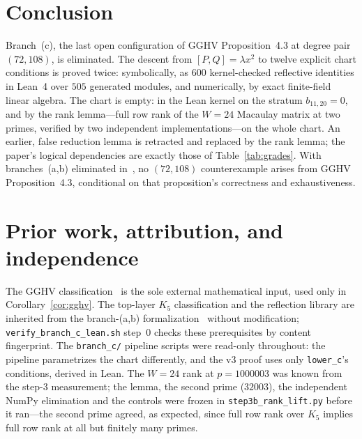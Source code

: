 \documentclass[a4paper,11pt]{article}
\theoremstyle{plain}
\theoremstyle{definition}
\theoremstyle{remark}
\begin{document}
\section{Conclusion}\label{sec:conclusion}

Branch~(c), the last open configuration of GGHV Proposition~4.3 at degree pair $(72,108)$, is eliminated. The descent from $[P,Q]=\lambda x^2$ to twelve explicit chart conditions is proved twice: symbolically, as $600$ kernel-checked reflective identities in Lean~4 over $505$ generated modules, and numerically, by exact finite-field linear algebra. The chart is empty: in the Lean kernel on the stratum $b_{11,20}=0$, and by the rank lemma---full row rank of the $W=24$ Macaulay matrix at two primes, verified by two independent implementations---on the whole chart. An earlier, false reduction lemma is retracted and replaced by the rank lemma; the paper's logical dependencies are exactly those of Table~\ref{tab:grades}. With branches~(a,b) eliminated in~\cite{BranchABv19}, no $(72,108)$ counterexample arises from GGHV Proposition~4.3, conditional on that proposition's correctness and exhaustiveness.

\section{Prior work, attribution, and independence}\label{sec:attribution}

The GGHV classification~\cite{GGHV} is the sole external mathematical input, used only in Corollary~\ref{cor:gghv}. The top-layer $K_5$ classification and the reflection library are inherited from the branch-(a,b) formalization~\cite{BranchABv19} without modification; \texttt{verify\_branch\_c\_lean.sh} step~0 checks these prerequisites by content fingerprint. The \texttt{branch\_c/} pipeline scripts were read-only throughout: the pipeline parametrizes the chart differently, and the v3 proof uses only \texttt{lower\_c}'s conditions, derived in Lean. The $W=24$ rank at $p=1000003$ was known from the step-3 measurement; the lemma, the second prime ($32003$), the independent NumPy elimination and the controls were frozen in \texttt{step3b\_rank\_lift.py} before it ran---the second prime agreed, as expected, since full row rank over $K_5$ implies full row rank at all but finitely many primes.
\end{document}
